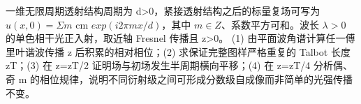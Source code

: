 一维无限周期透射结构周期为 d>0，紧接透射结构之后的标量复场可写为 \(u(x,0)=\Sigma m\) cm \(exp(i2\pi mx/d)\)，其中 \(m\in Z\)、系数平方可和。波长 \(\lambda >0\) 的单色相干光正入射，取近轴 Fresnel 传播且 z>0。
(1) 由平面波角谱计算任一傅里叶谐波传播 z 后积累的相对相位；(2) 求保证完整图样严格重复的 Talbot 长度 zT；(3) 在 z=zT/2 证明场与初场发生半周期横向平移；(4) 在 z=zT/4 分析偶、奇 m 的相位规律，说明不同衍射级之间可形成分数级自成像而非简单的光强传播不变。

